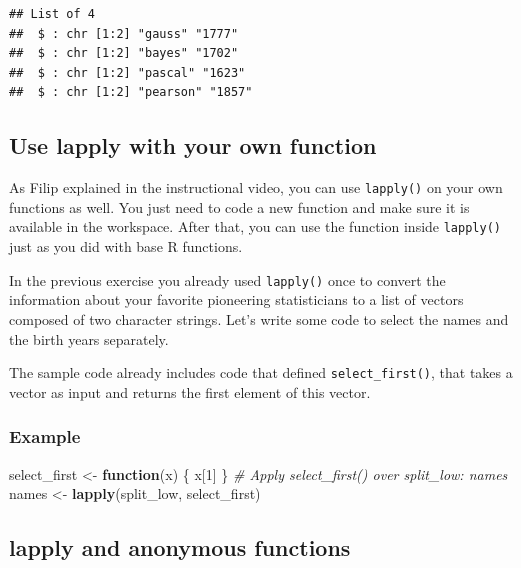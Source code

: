 \documentclass[
]{book}
\newenvironment{Shaded}{\begin{snugshade}}{\end{snugshade}}
\newcommand{\CommentTok}[1]{\textcolor[rgb]{0.56,0.35,0.01}{\textit{#1}}}
\newcommand{\ControlFlowTok}[1]{\textcolor[rgb]{0.13,0.29,0.53}{\textbf{#1}}}
\newcommand{\DecValTok}[1]{\textcolor[rgb]{0.00,0.00,0.81}{#1}}
\newcommand{\KeywordTok}[1]{\textcolor[rgb]{0.13,0.29,0.53}{\textbf{#1}}}
\newcommand{\NormalTok}[1]{#1}
\newcommand{\StringTok}[1]{\textcolor[rgb]{0.31,0.60,0.02}{#1}}
\begin{document}
\begin{verbatim}
## List of 4
##  $ : chr [1:2] "gauss" "1777"
##  $ : chr [1:2] "bayes" "1702"
##  $ : chr [1:2] "pascal" "1623"
##  $ : chr [1:2] "pearson" "1857"
\end{verbatim}

\hypertarget{use-lapply-with-your-own-function}{%
\subsection{Use lapply with your own function}\label{use-lapply-with-your-own-function}}

As Filip explained in the instructional video, you can use \texttt{lapply()} on your own functions as well. You just need to code a new function and make sure it is available in the workspace. After that, you can use the function inside \texttt{lapply()} just as you did with base R functions.

In the previous exercise you already used \texttt{lapply()} once to convert the information about your favorite pioneering statisticians to a list of vectors composed of two character strings. Let's write some code to select the names and the birth years separately.

The sample code already includes code that defined \texttt{select\_first()}, that takes a vector as input and returns the first element of this vector.

\hypertarget{example-1}{%
\subsubsection{Example}\label{example-1}}

\begin{Shaded}
\begin{Highlighting}[]
\NormalTok{select_first <-}\StringTok{ }\ControlFlowTok{function}\NormalTok{(x) \{}
\NormalTok{  x[}\DecValTok{1}\NormalTok{]}
\NormalTok{\}}
\CommentTok{# Apply select_first() over split_low: names}
\NormalTok{names <-}\StringTok{ }\KeywordTok{lapply}\NormalTok{(split_low, select_first)}
\end{Highlighting}
\end{Shaded}

\hypertarget{lapply-and-anonymous-functions}{%
\subsection{lapply and anonymous functions}\label{lapply-and-anonymous-functions}}
\end{document}
